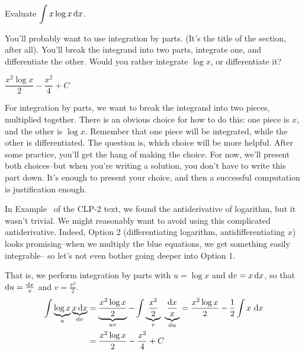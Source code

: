\begin{Mquestion}[M121 2014A]\label{1.7_xlogx}
Evaluate ${\displaystyle\int x\log x\,\mathrm{d}x}$.
\end{Mquestion}

\begin{hint}
You'll probably want to use integration by parts. (It's the title of the section, after all). You'll break the integrand into two parts, integrate one, and differentiate the other. Would you rather integrate $\log x$, or differentiate it?
\end{hint}

\begin{answer}
$\dfrac{x^2\log x}{2} - \dfrac{x^2}{4} + C$
\end{answer}

\begin{solution}
For integration by parts, we want to break the integrand into two pieces, multiplied together. There is an obvious choice for how to do this: one piece is $x$, and the other is $\log x$. Remember that one piece will be integrated, while the other is differentiated. The question is, which choice will be more helpful. After some practice, you'll get the hang of making the choice. For now, we'll present both choices--but when you're writing a solution, you don't have to write this part down. It's enough to present your choice, and then a successful computation is justification enough.


In Example~ of the CLP-2 text, we found the antiderivative of logarithm, but it wasn't trivial. We might reasonably want to avoid using this complicated antiderivative. Indeed,  Option 2 (differentiating logarithm, antidifferentiating $x$) looks promising--when we multiply the blue equations, we get something easily integrable-- so let's not even bother going deeper into Option 1.

That is, we perform integration by parts with $u=\log x$ and $\mathrm{d}v=x\,\mathrm{d}x$,
so that $\mathrm{d}u=\frac{\mathrm{d}x}{x}$ and $v = \frac{x^2}{2}$.
\begin{align*}
\int\underbrace{\log x}_{u}\underbrace{x\,\mathrm{d}x}_{\mathrm{d}v}
   &= \underbrace{\frac{x^2\log x}{2}}_{uv} - \int \underbrace{\frac{x^2}{2}}_v\ \underbrace{\frac{\mathrm{d}x}{x}}_{\mathrm{d}u}
    = \frac{x^2\log x}{2} -\frac{1}{2} \int x \ \mathrm{d}x \\
   &= \frac{x^2\log x}{2} - \frac{x^2}{4} + C
\end{align*}
\end{solution}

